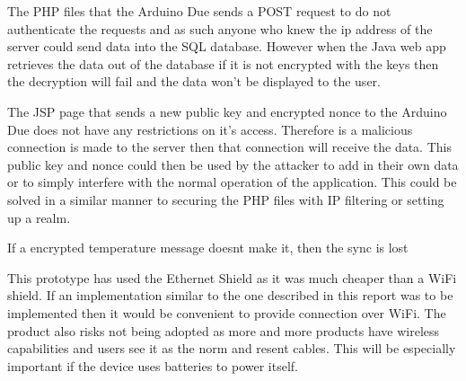 The PHP files that the Arduino Due sends a POST request to do not authenticate the requests and as such anyone who knew the ip address of the server could send data into the SQL database. However when the Java web app retrieves the data out of the database if it is not encrypted with the keys then the decryption will fail and the data won't be displayed to the user.

The JSP page that sends a new public key and encrypted nonce to the Arduino Due does not have any restrictions on it's access. Therefore is a malicious connection is made to the server then that connection will receive the data. This public key and nonce could then be used by the attacker to add in their own data or to simply interfere with the normal operation of the application. This could be solved in a similar manner to securing the PHP files with IP filtering or setting up a realm.

If a encrypted temperature message doesnt make it, then the sync is lost

This prototype has used the Ethernet Shield as it was much cheaper than a WiFi shield. If an implementation similar to the one described in this report was to be implemented then it would be convenient to provide connection over WiFi. The product also risks not being adopted as more and more products have wireless capabilities and  users see it as the norm and resent cables. This will be especially important if the device uses batteries to power itself.
